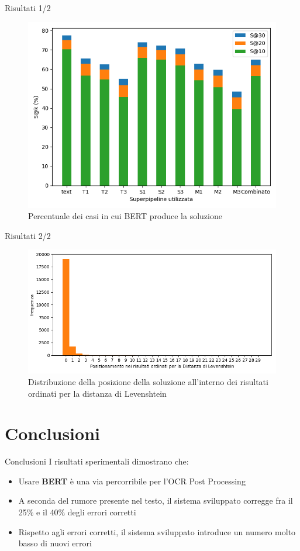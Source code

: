 \documentclass{beamer}
\begin{document}
\begin{frame}{Risultati 1/2}
\begin{figure}[H]
\centering
\includegraphics[width=.7\textwidth]{images/slides/overview}
\caption{Percentuale dei casi in cui BERT produce la soluzione}
\end{figure}
\end{frame}

\begin{frame}{Risultati 2/2}
\begin{figure}[H]
\centering
\includegraphics[width=\textwidth]{images/slides/lev_pos_Combinato}
\caption{Distribuzione della posizione della soluzione all'interno dei risultati ordinati per la distanza di Levenshtein}
\end{figure}
\end{frame}

\section{Conclusioni}
\begin{frame}{Conclusioni}
I risultati sperimentali dimostrano che:
\begin{itemize}
	\item Usare \textbf{BERT} è una via percorribile per l'OCR Post Processing
	\item A seconda del rumore presente nel testo, il sistema sviluppato corregge fra il 25\% e il 40\% degli errori corretti
	\item Rispetto agli errori corretti, il sistema sviluppato introduce un numero molto basso di nuovi errori
\end{itemize}
\end{frame}
\end{document}
